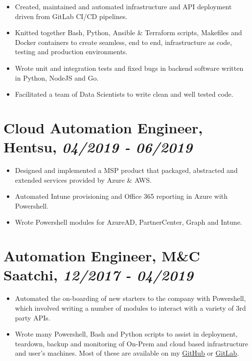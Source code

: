\documentclass[letterpaper]{article}
\begin{document}
\begin{itemize}
\item Created, maintained and automated infrastructure and API deployment driven
from GitLab CI/CD pipelines.

\item Knitted together Bash, Python, Ansible \& Terraform scripts, Makefiles and
Docker containers to create seamless, end to end, infrastructure as code,
testing and production environments.

\item Wrote unit and integration tests and fixed bugs in backend software written
in Python, NodeJS and Go.

\item Facilitated a team of Data Scientists to write clean and well tested code.
\end{itemize}

\section{Cloud Automation Engineer, Hentsu, \emph{04/2019 - 06/2019}}
\label{sec:org2edc323}

\begin{itemize}
\item Designed and implemented a MSP product that packaged, abstracted and extended
services provided by Azure \& AWS.

\item Automated Intune provisioning and Office 365 reporting in Azure with
Powershell.

\item Wrote Powershell modules for AzureAD, PartnerCenter, Graph and Intune.
\end{itemize}

\section{Automation Engineer, M\&C Saatchi, \emph{12/2017 - 04/2019}}
\label{sec:org6510056}

\begin{itemize}
\item Automated the on-boarding of new starters to the company with Powershell,
which involved writing a number of modules to interact with a variety of 3rd
party APIs.
\item Wrote many Powershell, Bash and Python scripts to assist in deployment,
teardown, backup and monitoring of On-Prem and cloud based infrastructure and
user's machines. Most of these are available on my \href{https://github.com/tslight}{GitHub} or \href{https://gitlab.com/tspub}{GitLab}.
\end{itemize}
\end{document}
